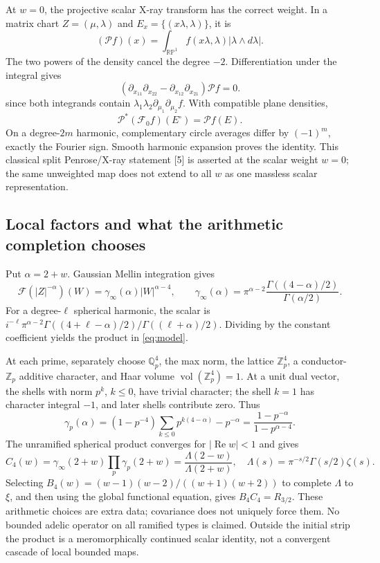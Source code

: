\documentclass[11pt,letterpaper]{article}
\newcommand{\Rea}{\operatorname{Re}}
\begin{document}
At $w=0$, the projective scalar X-ray transform has the correct weight. In a matrix chart $Z=(\mu,\lambda)$ and $E_x=\{(x\lambda,\lambda)\}$, it is
\[
 (\mathcal Pf)(x)=\int_{\mathbb{RP}^1}f(x\lambda,\lambda)|\lambda\wedge d\lambda|.
\]
The two powers of the density cancel the degree $-2$. Differentiation under the integral gives
\[
 (\partial_{x_{11}}\partial_{x_{22}}-\partial_{x_{12}}\partial_{x_{21}})\mathcal Pf=0.
\]
since both integrands contain $\lambda_1\lambda_2\partial_{\mu_1}\partial_{\mu_2}f$. With compatible plane densities,
\[
 \mathcal P^*(\mathcal F_0f)(E^\circ)=\mathcal Pf(E).
\]
On a degree-$2m$ harmonic, complementary circle averages differ by $(-1)^m$, exactly the Fourier sign. Smooth harmonic expansion proves the identity. This classical split Penrose/X-ray statement [5] is asserted at the scalar weight $w=0$; the same unweighted map does not extend to all $w$ as one massless scalar representation.

\subsection*{Local factors and what the arithmetic completion chooses}
Put $\alpha=2+w$. Gaussian Mellin integration gives
\[
 \mathcal F(|Z|^{-\alpha})(W)=\gamma_\infty(\alpha)|W|^{\alpha-4},\qquad
 \gamma_\infty(\alpha)=\pi^{\alpha-2}\frac{\Gamma((4-\alpha)/2)}{\Gamma(\alpha/2)}.
\]
For a degree-$\ell$ spherical harmonic, the scalar is
$i^{-\ell}\pi^{\alpha-2}\Gamma((4+\ell-\alpha)/2)/\Gamma((\ell+\alpha)/2)$.
Dividing by the constant coefficient yields the product in \eqref{eq:model}.

At each prime, separately choose $\mathbb Q_p^4$, the max norm, the lattice $\mathbb Z_p^4$, a conductor-$\mathbb Z_p$ additive character, and Haar volume $\operatorname{vol}(\mathbb Z_p^4)=1$. At a unit dual vector, the shells with norm $p^k$, $k\leq0$, have trivial character; the shell $k=1$ has character integral $-1$, and later shells contribute zero. Thus
\[
 \gamma_p(\alpha)=(1-p^{-4})\sum_{k\leq0}p^{k(4-\alpha)}-p^{-\alpha}
 =\frac{1-p^{-\alpha}}{1-p^{\alpha-4}}.
\]
The unramified spherical product converges for $|\Rea w|<1$ and gives
\[
 C_4(w)=\gamma_\infty(2+w)\prod_p\gamma_p(2+w)
 =\frac{\Lambda(2-w)}{\Lambda(2+w)},\quad
 \Lambda(s)=\pi^{-s/2}\Gamma(s/2)\zeta(s).
\]
Selecting $B_4(w)=(w-1)(w-2)/((w+1)(w+2))$ to complete $\Lambda$ to $\xi$, and then using the global functional equation, gives $B_4C_4=R_{3/2}$. These arithmetic choices are extra data; covariance does not uniquely force them. No bounded adelic operator on all ramified types is claimed. Outside the initial strip the product is a meromorphically continued scalar identity, not a convergent cascade of local bounded maps.
\end{document}
